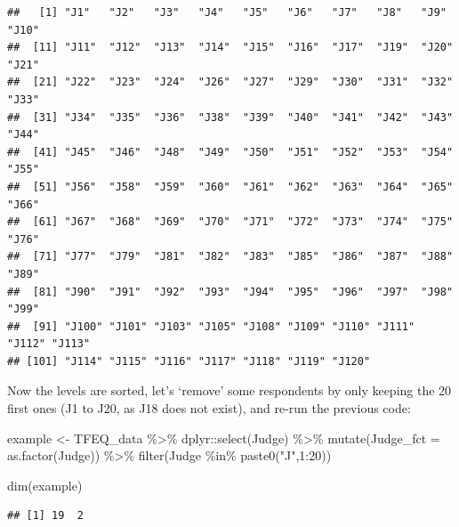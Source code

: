 \documentclass[
]{book}
\newenvironment{Shaded}{\begin{snugshade}}{\end{snugshade}}
\newcommand{\AttributeTok}[1]{\textcolor[rgb]{0.77,0.63,0.00}{#1}}
\newcommand{\DecValTok}[1]{\textcolor[rgb]{0.00,0.00,0.81}{#1}}
\newcommand{\FunctionTok}[1]{\textcolor[rgb]{0.00,0.00,0.00}{#1}}
\newcommand{\NormalTok}[1]{#1}
\newcommand{\OtherTok}[1]{\textcolor[rgb]{0.56,0.35,0.01}{#1}}
\newcommand{\SpecialCharTok}[1]{\textcolor[rgb]{0.00,0.00,0.00}{#1}}
\newcommand{\StringTok}[1]{\textcolor[rgb]{0.31,0.60,0.02}{#1}}
\begin{document}
\begin{verbatim}
##   [1] "J1"   "J2"   "J3"   "J4"   "J5"   "J6"   "J7"   "J8"   "J9"   "J10" 
##  [11] "J11"  "J12"  "J13"  "J14"  "J15"  "J16"  "J17"  "J19"  "J20"  "J21" 
##  [21] "J22"  "J23"  "J24"  "J26"  "J27"  "J29"  "J30"  "J31"  "J32"  "J33" 
##  [31] "J34"  "J35"  "J36"  "J38"  "J39"  "J40"  "J41"  "J42"  "J43"  "J44" 
##  [41] "J45"  "J46"  "J48"  "J49"  "J50"  "J51"  "J52"  "J53"  "J54"  "J55" 
##  [51] "J56"  "J58"  "J59"  "J60"  "J61"  "J62"  "J63"  "J64"  "J65"  "J66" 
##  [61] "J67"  "J68"  "J69"  "J70"  "J71"  "J72"  "J73"  "J74"  "J75"  "J76" 
##  [71] "J77"  "J79"  "J81"  "J82"  "J83"  "J85"  "J86"  "J87"  "J88"  "J89" 
##  [81] "J90"  "J91"  "J92"  "J93"  "J94"  "J95"  "J96"  "J97"  "J98"  "J99" 
##  [91] "J100" "J101" "J103" "J105" "J108" "J109" "J110" "J111" "J112" "J113"
## [101] "J114" "J115" "J116" "J117" "J118" "J119" "J120"
\end{verbatim}

\begin{Shaded}
\end{Shaded}

Now the levels are sorted, let's `remove' some respondents by only keeping the 20 first ones (J1 to J20, as J18 does not exist), and re-run the previous code:

\begin{Shaded}
\begin{Highlighting}[]
\NormalTok{example }\OtherTok{\textless{}{-}}\NormalTok{ TFEQ\_data }\SpecialCharTok{\%\textgreater{}\%} 
\NormalTok{  dplyr}\SpecialCharTok{::}\FunctionTok{select}\NormalTok{(Judge) }\SpecialCharTok{\%\textgreater{}\%} 
  \FunctionTok{mutate}\NormalTok{(}\AttributeTok{Judge\_fct =} \FunctionTok{as.factor}\NormalTok{(Judge)) }\SpecialCharTok{\%\textgreater{}\%} 
  \FunctionTok{filter}\NormalTok{(Judge }\SpecialCharTok{\%in\%} \FunctionTok{paste0}\NormalTok{(}\StringTok{"J"}\NormalTok{,}\DecValTok{1}\SpecialCharTok{:}\DecValTok{20}\NormalTok{))}

\FunctionTok{dim}\NormalTok{(example)}
\end{Highlighting}
\end{Shaded}

\begin{verbatim}
## [1] 19  2
\end{verbatim}
\end{document}
